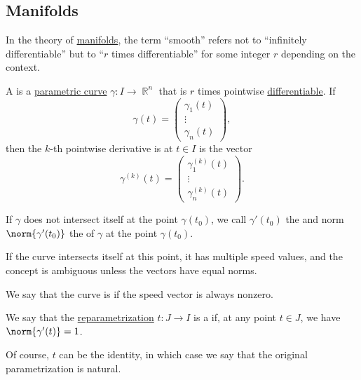 \subsection{Manifolds}\label{subsec:manifolds}

\begin{remark}\label{rem:smooth_manifold}
  In the theory of \hyperref[def:topological_manifold]{manifolds}, the term \enquote{smooth} refers not to \enquote{infinitely differentiable} but to \enquote{\( r \) times differentiable} for some integer \( r \) depending on the context.
\end{remark}

\begin{definition}\label{def:smooth_curve}
  A  is a \hyperref[def:parametric_curve]{parametric curve} \( \gamma: I \to \BbbR^n \) that is \( r \) times pointwise \hyperref[def:differentiability/frechet]{differentiable}. If
  \begin{equation*}
    \gamma(t) = \begin{pmatrix}
      \gamma_1(t) \\
      \vdots \\
      \gamma_n(t)
    \end{pmatrix},
  \end{equation*}
  then the \( k \)-th pointwise derivative is at \( t \in I \) is the vector
  \begin{equation*}
    \gamma^{(k)}(t) = \begin{pmatrix}
      \gamma_1^{(k)}(t) \\
      \vdots \\
      \gamma_n^{(k)}(t)
    \end{pmatrix}.
  \end{equation*}

  \begin{thmenum}
     If \( \gamma \) does not intersect itself at the point \( \gamma(t_0) \), we call \( \gamma'(t_0) \) the  and norm \( \norm{\gamma'(t_0)} \) the  of \( \gamma \) at the point \( \gamma(t_0) \).

    If the curve intersects itself at this point, it has multiple speed values, and the concept is ambiguous unless the vectors have equal norms.

     We say that the curve is  if the speed vector is always nonzero.

     We say that the \hyperref[def:reparametrization]{reparametrization} \( t: J \to I \) is a  if, at any point \( t \in J \), we have \( \norm{\gamma'(t)} = 1 \).

    Of course, \( t \) can be the identity, in which case we say that the original parametrization is natural.
  \end{thmenum}
\end{definition}

